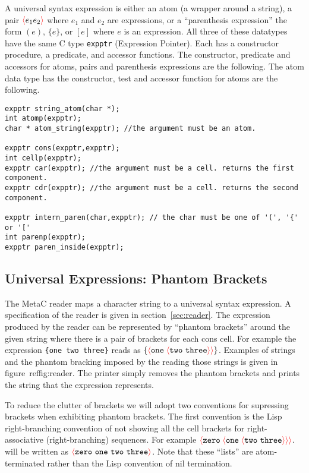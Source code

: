 \documentclass{article}
\newcommand{\mtt}[1]{\mbox{\tt #1}}
\newcommand{\fopen}{{\color{red} \langle}}
\newcommand{\fclose}{{\color{red} \rangle}}
\begin{document}
A universal syntax expression is either an atom (a wrapper around a string),
a pair $\fopen e_1 e_2 \fclose$ where $e_1$ and $e_2$ are expressions, or a ``parenthesis expression'' the form $(e)$,
$\{ e\}$, or $[e]$ where $e$ is an expression.   All three of these datatypes have the same C type {\tt expptr} (Expression Pointer).
Each has a constructor procedure, a predicate, and accessor functions.  The constructor, predicate and accessors for atoms, pairs and parenthesis expressions
are the following.
The atom data type has the constructor, test and accessor function for atoms are the following.

\begin{verbatim}
expptr string_atom(char *);
int atomp(expptr);
char * atom_string(expptr); //the argument must be an atom.

expptr cons(expptr,expptr);
int cellp(expptr);
expptr car(expptr); //the argument must be a cell. returns the first component.
expptr cdr(expptr); //the argument must be a cell. returns the second component.

expptr intern_paren(char,expptr); // the char must be one of '(', '{' or '['
int parenp(expptr);
expptr paren_inside(expptr);
\end{verbatim}

\subsection{Universal Expressions: Phantom Brackets}

The MetaC reader maps a character string to a universal syntax expression.  A specification of the reader is given in section~\ref{sec:reader}.
The expression produced by the reader
can be represented by ``phantom brackets'' around the given string
where there is a pair of brackets for each cons cell.
For example the expression \mtt{\{one two three\}} reads as $\{\fopen \mathtt{one}\;\fopen \mathtt{two~three}\fclose \fclose\}$.
Examples of strings and the phantom bracking imposed by the reading those strings is given in figure~{ref{fig:reader}}.
The printer simply removes the phantom brackets and prints the string that the expression represents.

To reduce the clutter of brackets we will adopt two conventions for supressing brackets when exhibiting phantom brackets.
The first convention is the Lisp right-branching convention of not showing all the cell brackets for right-associative (right-branching) sequences.
For example $\fopen \mathtt{zero}\;\fopen \mathtt{one}\;\fopen \mathtt{two~three}\fclose \fclose \fclose$.
will be written as $\fopen\mathtt{zero~one~two~three}\fclose$.  Note that these ``lists'' are atom-terminated rather than the Lisp convention of
nil termination.
\end{document}

